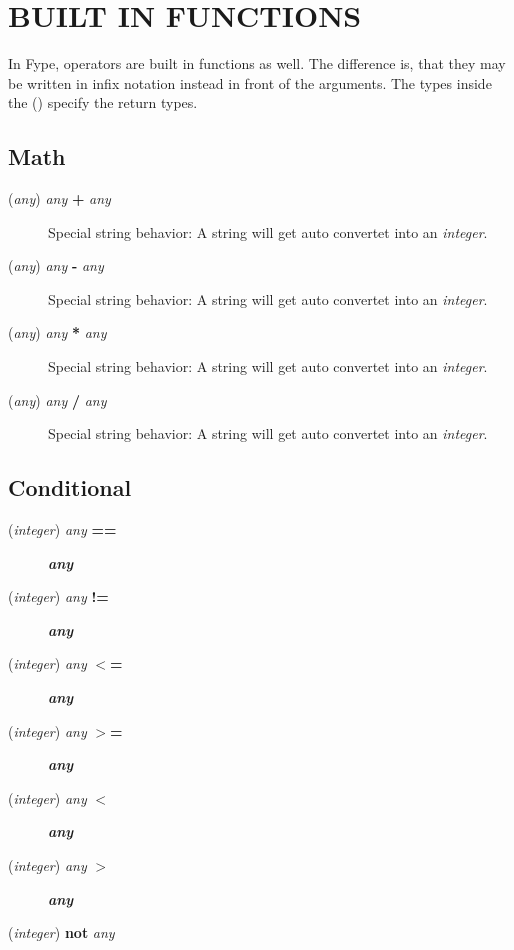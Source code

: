 \section{BUILT IN FUNCTIONS\label{BUILT_IN_FUNCTIONS}}


In Fype, operators are built in functions as well. The difference is, that they may be written in infix notation instead in front of the arguments. The types inside the () specify the return types.

\subsection*{Math\label{Math}}
\begin{description}

\item[{(\textit{any}) \textit{any} \textbf{+} \textit{any}}] \mbox{}

Special string behavior: A string will get auto convertet into an \textit{integer}.


\item[{(\textit{any}) \textit{any} \textbf{-} \textit{any}}] \mbox{}

Special string behavior: A string will get auto convertet into an \textit{integer}.


\item[{(\textit{any}) \textit{any} \textbf{*} \textit{any}}] \mbox{}

Special string behavior: A string will get auto convertet into an \textit{integer}.


\item[{(\textit{any}) \textit{any} \textbf{/} \textit{any}}] \mbox{}

Special string behavior: A string will get auto convertet into an \textit{integer}.

\end{description}
\subsection*{Conditional\label{Conditional}}
\begin{description}

\item[{(\textit{integer}) \textit{any} \textbf{==}}] \textbf{\textit{any}}
\item[{(\textit{integer}) \textit{any} \textbf{!=}}] \textbf{\textit{any}}
\item[{(\textit{integer}) \textit{any} \textbf{$<$=}}] \textbf{\textit{any}}
\item[{(\textit{integer}) \textit{any} \textbf{$>$=}}] \textbf{\textit{any}}
\item[{(\textit{integer}) \textit{any} \textbf{$<$}}] \textbf{\textit{any}}
\item[{(\textit{integer}) \textit{any} \textbf{$>$}}] \textbf{\textit{any}}
\item[{(\textit{integer}) \textbf{not} \textit{any}}] \mbox{}\end{description}
